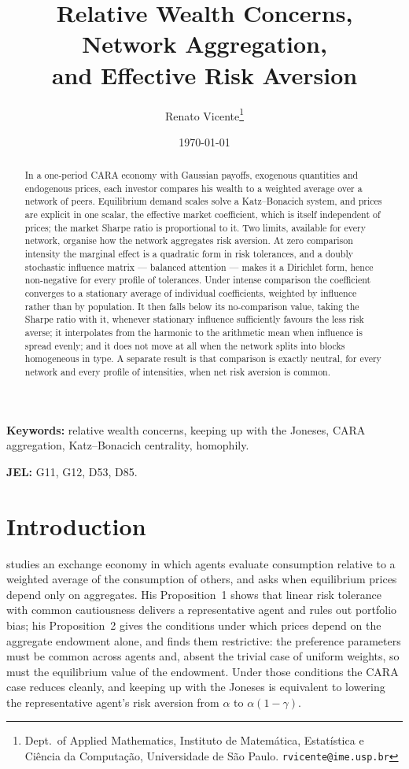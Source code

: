 \documentclass[12pt]{article}
\title{Relative Wealth Concerns, Network Aggregation,\\
and Effective Risk Aversion}
\author{Renato Vicente\thanks{Dept.\ of Applied Mathematics, Instituto de
Matem\'atica, Estat\'istica e Ci\^encia da Computa\c{c}\~ao, Universidade de
S\~ao Paulo. \texttt{rvicente@ime.usp.br}}}
\date{\today}
\theoremstyle{definition}
\theoremstyle{remark}
\begin{document}
\maketitle

\begin{abstract}
In a one-period CARA economy with Gaussian payoffs, exogenous quantities and
endogenous prices, each investor compares his wealth to a weighted average over
a network of peers. Equilibrium demand scales solve a Katz--Bonacich system, and
prices are explicit in one scalar, the effective market coefficient, which is
itself independent of prices; the market Sharpe ratio is proportional to it. Two
limits, available for every network, organise how the network aggregates risk
aversion. At zero comparison intensity the marginal effect is a quadratic form
in risk tolerances, and a doubly stochastic influence matrix --- balanced
attention --- makes it a Dirichlet form, hence non-negative for every profile of
tolerances. Under intense comparison the coefficient converges to a stationary
average of individual coefficients, weighted by influence rather than by
population. It then falls below its no-comparison value, taking the Sharpe ratio
with it, whenever stationary influence sufficiently favours the less risk
averse; it interpolates from the harmonic to the arithmetic mean when influence
is spread evenly; and it does not move at all when the network splits into
blocks homogeneous in type. A
separate result is that comparison is exactly neutral, for every network and
every profile of intensities, when net risk aversion is common.
\end{abstract}

\noindent\textbf{Keywords:} relative wealth concerns, keeping up with the
Joneses, CARA aggregation, Katz--Bonacich centrality, homophily.

\medskip
\noindent\textbf{JEL:} G11, G12, D53, D85.

\section{Introduction}

\cite{gomez} studies an exchange economy in which agents evaluate consumption
relative to a weighted average of the consumption of others, and asks when
equilibrium prices depend only on aggregates. His Proposition~1 shows that
linear risk tolerance with common cautiousness delivers a representative agent
and rules out portfolio bias; his Proposition~2 gives the conditions under
which prices depend on the aggregate endowment alone, and finds them
restrictive: the preference parameters must be common across agents and, absent
the trivial case of uniform weights, so must the equilibrium value of the
endowment. Under those conditions the CARA case reduces cleanly, and keeping up
with the Joneses is equivalent to lowering the representative agent's risk
aversion from $\alpha$ to $\alpha(1-\gamma)$.
\end{document}
